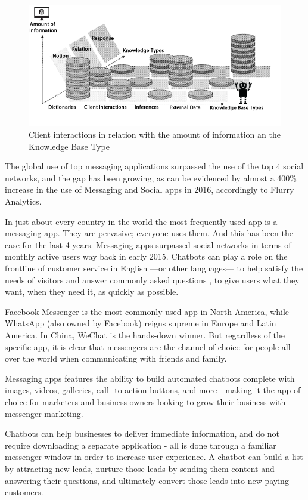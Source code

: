 \documentclass[	DIV=calc,%
							paper=letter,%
							fontsize=12pt%
                            ]{scrartcl}	 					%
\begin{document}
\begin{figure}[H]
\centering
\includegraphics[scale=0.60]{img/AmoutInformation.png}
\caption{Client interactions in relation with the amount of information an the Knowledge Base Type \cite{borzestowski2012systems}}
\label{ChatbotRepresentatio}
\end{figure}

The global use of top messaging applications surpassed the use of the top 4 social networks, and the gap has been growing, as can be evidenced by almost a 400\% increase in the use of Messaging and Social apps in 2016, accordingly to Flurry Analytics.\cite{hsiao2016exploring}

In just about every country in the world the most frequently used app is a messaging app. They are pervasive; everyone uses them. And this has been the case for the last 4 years. Messaging apps surpassed social networks in terms of monthly active users way back in early 2015.
Chatbots can play a role on the frontline of customer service in English —or other languages— to help satisfy the needs of visitors and answer commonly asked questions , to give users what they want, when they need it, as quickly as possible. 

Facebook Messenger is the most commonly used app in North America, while WhatsApp (also owned by Facebook) reigns supreme in Europe and Latin America. In China, WeChat is the hands-down winner. But regardless of the specific app, it is clear that messengers are the channel of choice for people all over the world when communicating with friends and family.

Messaging apps features the ability to build automated chatbots complete with images, videos, galleries,
call- to-action buttons, and more—making it the app of choice for marketers and business owners looking to grow their business with messenger marketing.

Chatbots can help businesses to deliver immediate information, and do not require downloading a separate application - all is done through a familiar messenger window in order to increase user experience. A chatbot can build a list by attracting new leads, nurture those leads by sending them content and answering their questions, and ultimately convert those leads into new paying customers.
\end{document}
